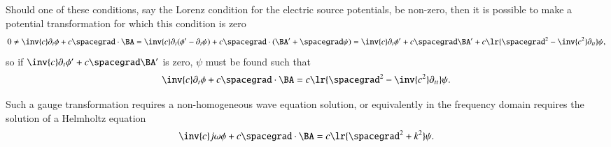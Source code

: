 Should one of these conditions, say the Lorenz condition for the electric source potentials, be non-zero, then it is possible to make a potential transformation for which this condition is zero
\begin{dmath}\label{eqn:potentialSection_LorenzGauge:1680}
0 \ne
\inv{c} \partial_t \phi + c \spacegrad \cdot \BA
=
\inv{c} \partial_t (\phi' - \partial_t \psi) + c \spacegrad \cdot (\BA' + \spacegrad \psi)
=
\inv{c} \partial_t \phi' + c \spacegrad \BA'
+ c \lr{ \spacegrad^2 - \inv{c^2} \partial_{tt} } \psi,
\end{dmath}
so if \( \inv{c} \partial_t \phi' + c \spacegrad \BA' \) is zero, \( \psi \) must be found such that
\begin{dmath}\label{eqn:potentialSection_LorenzGauge:1700}
\inv{c} \partial_t \phi + c \spacegrad \cdot \BA
= c \lr{ \spacegrad^2 - \inv{c^2} \partial_{tt} } \psi.
\end{dmath}

Such a gauge transformation requires a non-homogeneous wave equation solution, or equivalently in the frequency domain requires the solution of a Helmholtz equation
\begin{dmath}\label{eqn:potentialSection_LorenzGauge:1740}
\inv{c} j \omega \phi + c \spacegrad \cdot \BA
= c \lr{ \spacegrad^2 + k^2 } \psi.
\end{dmath}

